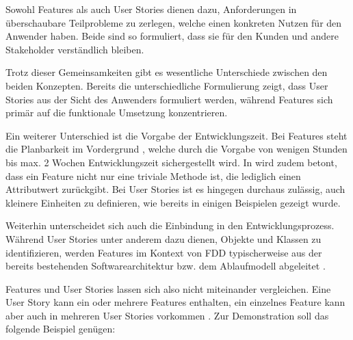 \documentclass[acmtog]{acmart}
\begin{document}
Sowohl Features als auch User Stories dienen dazu, Anforderungen in überschaubare Teilprobleme zu zerlegen, welche einen konkreten Nutzen für den Anwender haben. Beide sind so formuliert, dass sie für den Kunden und andere Stakeholder verständlich bleiben.

Trotz dieser Gemeinsamkeiten gibt es wesentliche Unterschiede zwischen den beiden Konzepten.
Bereits die unterschiedliche Formulierung zeigt, dass User Stories aus der Sicht des Anwenders formuliert werden, während Features sich primär auf die funktionale Umsetzung konzentrieren.

Ein weiterer Unterschied ist die Vorgabe der Entwicklungszeit.
Bei Features steht die Planbarkeit im Vordergrund \cite{hunt06}, welche durch die Vorgabe von wenigen Stunden bis max. 2 Wochen Entwicklungszeit sichergestellt wird.
In \cite{palmer02} wird zudem betont, dass ein Feature nicht nur eine triviale Methode ist, die lediglich einen Attributwert zurückgibt.
Bei User Stories ist es hingegen durchaus zulässig, auch kleinere Einheiten zu definieren, wie bereits in einigen Beispielen gezeigt wurde.

Weiterhin unterscheidet sich auch die Einbindung in den Entwicklungsprozess.
Während User Stories unter anderem dazu dienen, Objekte und Klassen zu identifizieren, werden Features im Kontext von FDD typischerweise aus der bereits bestehenden Softwarearchitektur bzw. dem Ablaufmodell abgeleitet \cite{palmer02}.

Features und User Stories lassen sich also nicht miteinander vergleichen. Eine User Story kann ein oder mehrere Features enthalten, ein einzelnes Feature kann aber auch in mehreren User Stories vorkommen \cite{hunt06}. Zur Demonstration soll das folgende Beispiel genügen:\smallskip

\end{document}
